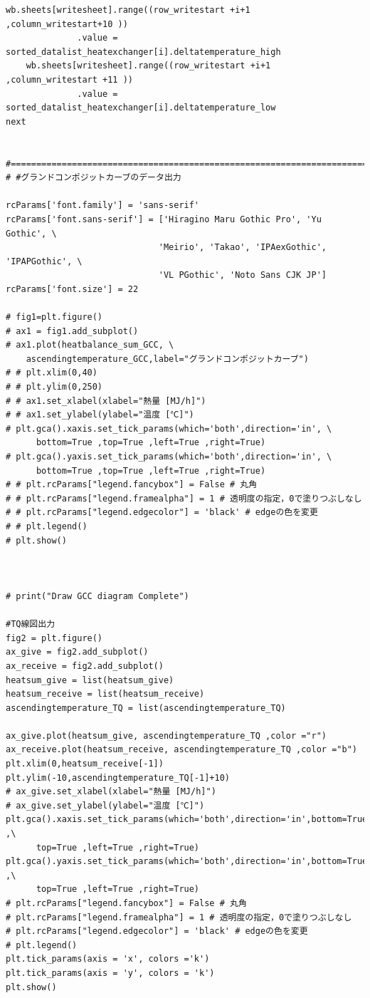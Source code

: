 \documentclass[a4j]{jsreport}
\begin{document}
\begin{lstlisting}[caption=グランドコンポジットカーブおよびTQ線図を書くコード]
    wb.sheets[writesheet].range((row_writestart +i+1  ,column_writestart+10 ))
              .value = sorted_datalist_heatexchanger[i].deltatemperature_high
    wb.sheets[writesheet].range((row_writestart +i+1 ,column_writestart +11 ))
              .value = sorted_datalist_heatexchanger[i].deltatemperature_low
next


#==============================================================================
# #グランドコンポジットカーブのデータ出力

rcParams['font.family'] = 'sans-serif'
rcParams['font.sans-serif'] = ['Hiragino Maru Gothic Pro', 'Yu Gothic', \
                              'Meirio', 'Takao', 'IPAexGothic', 'IPAPGothic', \
                              'VL PGothic', 'Noto Sans CJK JP']
rcParams['font.size'] = 22

# fig1=plt.figure()
# ax1 = fig1.add_subplot()
# ax1.plot(heatbalance_sum_GCC, \
    ascendingtemperature_GCC,label="グランドコンポジットカーブ")
# # plt.xlim(0,40)
# # plt.ylim(0,250)
# # ax1.set_xlabel(xlabel="熱量 [MJ/h]")
# # ax1.set_ylabel(ylabel="温度 [℃]")
# plt.gca().xaxis.set_tick_params(which='both',direction='in', \
      bottom=True ,top=True ,left=True ,right=True)
# plt.gca().yaxis.set_tick_params(which='both',direction='in', \
      bottom=True ,top=True ,left=True ,right=True)
# # plt.rcParams["legend.fancybox"] = False # 丸角
# # plt.rcParams["legend.framealpha"] = 1 # 透明度の指定，0で塗りつぶしなし
# # plt.rcParams["legend.edgecolor"] = 'black' # edgeの色を変更
# # plt.legend()
# plt.show()



# print("Draw GCC diagram Complete")

#TQ線図出力
fig2 = plt.figure()
ax_give = fig2.add_subplot()
ax_receive = fig2.add_subplot()
heatsum_give = list(heatsum_give)
heatsum_receive = list(heatsum_receive)
ascendingtemperature_TQ = list(ascendingtemperature_TQ)

ax_give.plot(heatsum_give, ascendingtemperature_TQ ,color ="r")
ax_receive.plot(heatsum_receive, ascendingtemperature_TQ ,color ="b")
plt.xlim(0,heatsum_receive[-1])
plt.ylim(-10,ascendingtemperature_TQ[-1]+10)
# ax_give.set_xlabel(xlabel="熱量 [MJ/h]")
# ax_give.set_ylabel(ylabel="温度 [℃]")
plt.gca().xaxis.set_tick_params(which='both',direction='in',bottom=True ,\
      top=True ,left=True ,right=True)
plt.gca().yaxis.set_tick_params(which='both',direction='in',bottom=True ,\
      top=True ,left=True ,right=True)
# plt.rcParams["legend.fancybox"] = False # 丸角
# plt.rcParams["legend.framealpha"] = 1 # 透明度の指定，0で塗りつぶしなし
# plt.rcParams["legend.edgecolor"] = 'black' # edgeの色を変更
# plt.legend()
plt.tick_params(axis = 'x', colors ='k')
plt.tick_params(axis = 'y', colors = 'k')
plt.show()
\end{lstlisting}
\end{document}
